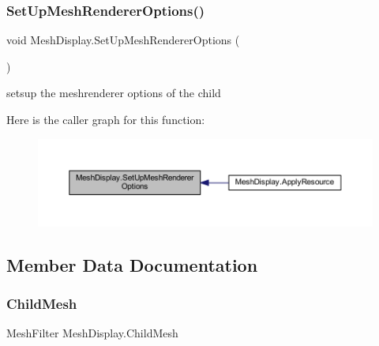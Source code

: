 \mbox{\label{class_mesh_display_ab87e001316410059093fac5d92326ef2}} 
\subsubsection{\texorpdfstring{Set\+Up\+Mesh\+Renderer\+Options()}{SetUpMeshRendererOptions()}}
{\footnotesize\ttfamily void Mesh\+Display.\+Set\+Up\+Mesh\+Renderer\+Options (\begin{DoxyParamCaption}{ }\end{DoxyParamCaption})\hspace{0.3cm}{\ttfamily [private]}}



setsup the meshrenderer options of the child 

Here is the caller graph for this function\+:
\nopagebreak
\begin{figure}[H]
\begin{center}
\leavevmode
\includegraphics[width=350pt]{class_mesh_display_ab87e001316410059093fac5d92326ef2_icgraph}
\end{center}
\end{figure}


\subsection{Member Data Documentation}
\mbox{\label{class_mesh_display_aef69e30c103e4ccea952b87876384d6d}} 
\subsubsection{\texorpdfstring{Child\+Mesh}{ChildMesh}}
{\footnotesize\ttfamily Mesh\+Filter Mesh\+Display.\+Child\+Mesh}



